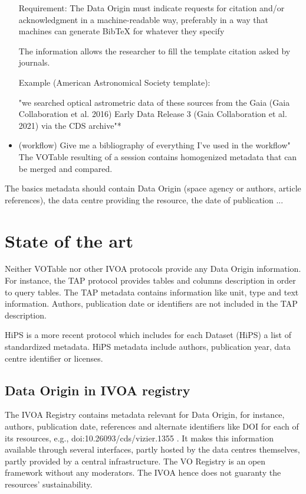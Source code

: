 \documentclass[11pt,a4paper]{ivoa}
\begin{document}
\begin{itemize}
	Requirement: The Data Origin must indicate requests for citation and/or acknowledgment in a machine-readable way, preferably in a way that machines can generate BibTeX for whatever they specify
	
	The information allows the researcher to fill the template citation asked by journals.
	
	Example (American Astronomical Society template):
	
	"we searched optical astrometric data of these sources from the Gaia (Gaia Collaboration et al. 2016) Early Data Release 3 (Gaia Collaboration et al. 2021) via the CDS archive"*
	
	\item (workflow) Give me a bibliography of everything I've used in the workflow"
	The VOTable resulting of a session contains homogenized metadata that can be merged and compared.
	
\end{itemize}

The basics metadata should contain Data Origin (space agency or authors, article references), the data centre providing the resource, the date of publication ...

\section{State of the art}

Neither VOTable \citep{2019ivoa.spec.1021O} nor other IVOA protocols provide any Data Origin information. For instance, the TAP protocol \citep{2019ivoa.spec.0927D} provides tables and columns description in order to query tables. The TAP metadata contains information like unit, type and text information. Authors, publication date or identifiers are not included in the TAP description.

HiPS \citep{2017ivoa.spec.0519F} is a more recent protocol which includes for each Dataset (HiPS) a list of standardized metadata. HiPS metadata include authors, publication year, data centre identifier or licenses.


\subsection{Data Origin in IVOA registry}
The IVOA Registry contains metadata relevant for Data Origin, for instance, authors, publication date, references and alternate identifiers like DOI for each of its resources,
e.g., doi:10.26093/cds/vizier.1355 \citep{2018ivoa.spec.0625P}.
It makes this information available through several interfaces, partly
hosted by the data centres themselves, partly provided by a central
infrastructure.
The VO Registry is an open framework without any moderators.
The IVOA hence does not guaranty the resources' sustainability.
\end{document}
